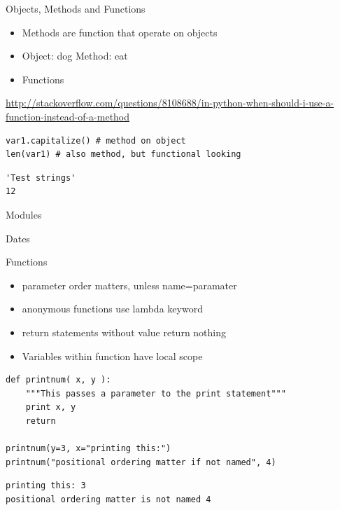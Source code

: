 \documentclass[presentation]{beamer}
\begin{document}
\begin{frame}[fragile,label=sec-4-1-16]{Objects, Methods and Functions}
 \begin{itemize}
\item Methods are function that operate on objects
\item Object: dog Method: eat
\item Functions
\end{itemize}
\url{http://stackoverflow.com/questions/8108688/in-python-when-should-i-use-a-function-instead-of-a-method}


\lstset{numbers=left,language=Python,label= ,caption= }
\begin{lstlisting}
var1.capitalize() # method on object
len(var1) # also method, but functional looking
\end{lstlisting}

\lstset{numbers=left,language=Python,label= ,caption= }
\begin{lstlisting}
'Test strings'
12
\end{lstlisting}
\end{frame}


\begin{frame}[label=sec-4-1-17]{Modules}
\end{frame}

\begin{frame}[label=sec-4-1-18]{Dates}
\end{frame}

\begin{frame}[fragile,label=sec-4-1-19]{Functions}
 \begin{itemize}
\item parameter order matters, unless name=paramater
\item anonymous functions use lambda keyword
\item return statements without value return nothing
\item Variables within function have local scope
\end{itemize}

\lstset{numbers=left,language=Python,label= ,caption= }
\begin{lstlisting}
def printnum( x, y ):
    """This passes a parameter to the print statement"""
    print x, y
    return

printnum(y=3, x="printing this:")
printnum("positional ordering matter if not named", 4)
\end{lstlisting}

\lstset{numbers=left,language=Python,label= ,caption= }
\begin{lstlisting}
printing this: 3
positional ordering matter is not named 4
\end{lstlisting}
\end{frame}
\end{document}
